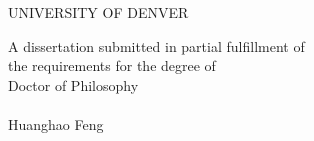 \newpage
\thispagestyle{empty}
\renewcommand{\baselinestretch}{1.3}
\begin{center}

UNIVERSITY OF DENVER\\
\vspace{0.5in}

A dissertation submitted in partial fulfillment of \\
the requirements for the degree of\\
Doctor of Philosophy\\
\vspace{1in} {\large \mytitleA}\\
\vspace{0.75in}
Huanghao Feng\\
\vspace{0.5in}
\begin{flushleft}
\end{flushleft}
\vspace{0.5in}
\renewcommand{\arraystretch}{0.75}
\setlength{\tabcolsep}{0.5in} 
\end{center}
